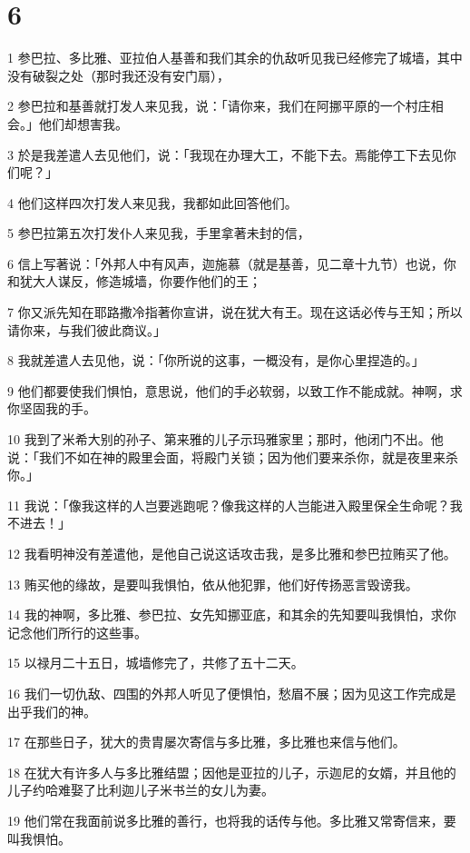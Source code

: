 \chapter{6}

\par 1 参巴拉、多比雅、亚拉伯人基善和我们其余的仇敌听见我已经修完了城墙，其中没有破裂之处（那时我还没有安门扇），
\par 2 参巴拉和基善就打发人来见我，说：「请你来，我们在阿挪平原的一个村庄相会。」他们却想害我。
\par 3 於是我差遣人去见他们，说：「我现在办理大工，不能下去。焉能停工下去见你们呢？」
\par 4 他们这样四次打发人来见我，我都如此回答他们。
\par 5 参巴拉第五次打发仆人来见我，手里拿著未封的信，
\par 6 信上写著说：「外邦人中有风声，迦施慕（就是基善，见二章十九节）也说，你和犹大人谋反，修造城墙，你要作他们的王；
\par 7 你又派先知在耶路撒冷指著你宣讲，说在犹大有王。现在这话必传与王知；所以请你来，与我们彼此商议。」
\par 8 我就差遣人去见他，说：「你所说的这事，一概没有，是你心里捏造的。」
\par 9 他们都要使我们惧怕，意思说，他们的手必软弱，以致工作不能成就。神啊，求你坚固我的手。
\par 10 我到了米希大别的孙子、第来雅的儿子示玛雅家里；那时，他闭门不出。他说：「我们不如在神的殿里会面，将殿门关锁；因为他们要来杀你，就是夜里来杀你。」
\par 11 我说：「像我这样的人岂要逃跑呢？像我这样的人岂能进入殿里保全生命呢？我不进去！」
\par 12 我看明神没有差遣他，是他自己说这话攻击我，是多比雅和参巴拉贿买了他。
\par 13 贿买他的缘故，是要叫我惧怕，依从他犯罪，他们好传扬恶言毁谤我。
\par 14 我的神啊，多比雅、参巴拉、女先知挪亚底，和其余的先知要叫我惧怕，求你记念他们所行的这些事。
\par 15 以禄月二十五日，城墙修完了，共修了五十二天。
\par 16 我们一切仇敌、四围的外邦人听见了便惧怕，愁眉不展；因为见这工作完成是出乎我们的神。
\par 17 在那些日子，犹大的贵胄屡次寄信与多比雅，多比雅也来信与他们。
\par 18 在犹大有许多人与多比雅结盟；因他是亚拉的儿子，示迦尼的女婿，并且他的儿子约哈难娶了比利迦儿子米书兰的女儿为妻。
\par 19 他们常在我面前说多比雅的善行，也将我的话传与他。多比雅又常寄信来，要叫我惧怕。


